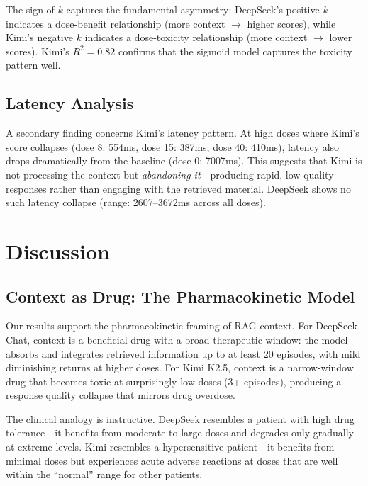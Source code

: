 \documentclass[11pt,a4paper]{article}
\begin{document}
The sign of $k$ captures the fundamental asymmetry: DeepSeek's positive $k$ indicates a dose-benefit relationship (more context $\rightarrow$ higher scores), while Kimi's negative $k$ indicates a dose-toxicity relationship (more context $\rightarrow$ lower scores). Kimi's $R^2 = 0.82$ confirms that the sigmoid model captures the toxicity pattern well.

\subsection{Latency Analysis}

A secondary finding concerns Kimi's latency pattern. At high doses where Kimi's score collapses (dose 8: 554ms, dose 15: 387ms, dose 40: 410ms), latency also drops dramatically from the baseline (dose 0: 7007ms). This suggests that Kimi is not processing the context but \emph{abandoning it}---producing rapid, low-quality responses rather than engaging with the retrieved material. DeepSeek shows no such latency collapse (range: 2607--3672ms across all doses).

\section{Discussion}

\subsection{Context as Drug: The Pharmacokinetic Model}

Our results support the pharmacokinetic framing of RAG context. For DeepSeek-Chat, context is a beneficial drug with a broad therapeutic window: the model absorbs and integrates retrieved information up to at least 20 episodes, with mild diminishing returns at higher doses. For Kimi K2.5, context is a narrow-window drug that becomes toxic at surprisingly low doses (3+ episodes), producing a response quality collapse that mirrors drug overdose.

The clinical analogy is instructive. DeepSeek resembles a patient with high drug tolerance---it benefits from moderate to large doses and degrades only gradually at extreme levels. Kimi resembles a hypersensitive patient---it benefits from minimal doses but experiences acute adverse reactions at doses that are well within the ``normal'' range for other patients.
\end{document}
